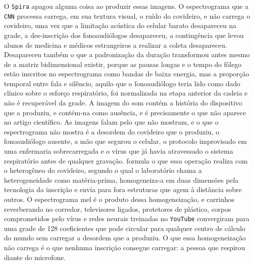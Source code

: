 O \texttt{Spira} apagou alguma coisa ao produzir essas imagens. O espectrograma que a \texttt{CNN} processa carrega, em sua textura visual, o ruído do covideiro, e não carrega o covideiro, uma vez que a limitação acústica do celular barato desapareceu na grade, a des-inscrição dos fonoaudiólogos desapareceu, a contingência que levou alunos de medicina e médicos estrangeiros a realizar a coleta desapareceu. Desapareceu também o que a padronização da duração transformou antes mesmo de a matriz bidimensional existir, porque as pausas longas e o tempo do fôlego estão inscritos no espectrograma como bandas de baixa energia, mas a proporção temporal entre fala e silêncio, aquilo que o fonoaudiólogo teria lido como dado clínico sobre o esforço respiratório, foi normalizada na etapa anterior da cadeia e não é recuperável da grade. A imagem do som contém a história do dispositivo que a produziu, e contém-na como ausência, e é precisamente o que não aparece no artigo científico. As imagens falam pelo que não mostram, e o que o espectrograma não mostra é a desordem do covideiro que o produziu, o fonoaudiólogo ausente, a mão que segurou o celular, o protocolo improvisado em uma enfermaria sobrecarregada e o vírus que já havia atravessado o sistema respiratório antes de qualquer gravação. \textcite{Law1986Laboratories} formula o que essa operação realiza com o heterogêneo do covideiro, segundo o qual o laboratório chama a heterogeneidade como matéria-prima, homogeneiza-a em duas dimensões pela tecnologia da inscrição e envia para fora estruturas que agem à distância sobre outros. O espectrograma mel é o produto dessa homogeneização, e carrinhos reverberando no corredor, televisores ligados, protetores de plástico, corpos comprometidos pelo vírus e redes neurais treinadas no \texttt{YouTube} convergiram para uma grade de 128 coeficientes que pode circular para qualquer centro de cálculo do mundo sem carregar a desordem que a produziu. O que essa homogeneização não carrega é o que nenhuma inscrição consegue carregar: a pessoa que respirou diante do microfone.

